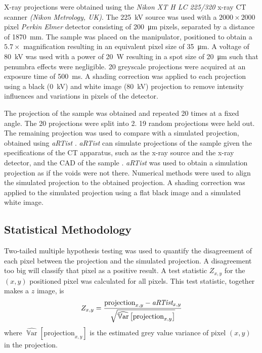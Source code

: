 \documentclass{proc}
\DeclareMathOperator{\variance}{\mathbb{V}ar}
\begin{document}
X-ray projections were obtained using the \emph{Nikon XT H LC 225/320} x-ray CT scanner \emph{(Nikon Metrology, UK)}. The \SI{225}{\kilo\volt} source was used with a $2000\times2000$ pixel \emph{Perkin Elmer} detector consisting of \SI{200}{\micro\metre} pixels, separated by a distance of \SI{1870}{\milli\metre}. The sample was placed on the manipulator, positioned to obtain a $5.7\times$ magnification resulting in an equivalent pixel size of \SI{35}{\micro\metre}. A voltage of \SI{80}{\kilo\volt} was used with a power of \SI{20}{\watt} resulting in a spot size of \SI{20}{\micro\metre} such that penumbra effects were negligible. 20 greyscale projections were acquired at an exposure time of \SI{500}{\milli\second}. A shading correction \citep{young2000shading, munzenmayer2003enhancing} was applied to each projection using a black (\SI{0}{\kilo\volt}) and white image (\SI{80}{\kilo\volt}) projection to remove intensity influences and variations in pixels of the detector.

The projection of the sample was obtained and repeated 20 times at a fixed angle. The 20 projections were split into 2. 19 random projections were held out. The remaining projection was used to compare with a simulated projection, obtained using \emph{aRTist} \citep{bellon2007artist, jaenisch2008artist, bellon2012radiographic}. \emph{aRTist} can simulate projections of the sample given the specifications of the CT apparatus, such as the x-ray source and the x-ray detector, and the
CAD of the sample \citep{bellon2011simulation, deresch2012simulating}. \emph{aRTist} was used to obtain a simulation projection as if the voids were not there. Numerical methods were used to align the simulated projection to the obtained projection. A shading correction was applied to the simulated projection using a flat black image and a simulated white image.

\subsection{Statistical Methodology}

Two-tailed multiple hypothesis testing \citep{pearson1900on, neyman1933on, fisher1970statistical} was used to quantify the disagreement of each pixel between the projection and the simulated projection. A disagreement too big will classify that pixel as a positive result. A test statistic $Z_{x,y}$ for the $(x,y)$ positioned pixel was calculated for all pixels. This test statistic, together makes a $z$ image, is
\begin{equation}
  Z_{x,y} = 
  \dfrac{
    \text{projection}_{x,y} - \emph{aRTist}_{x,y}
  }
  {
    \sqrt{\widehat{\variance}\left[\text{projection}_{x,y}\right]}
  }
\end{equation}
where $\widehat{\variance}\left[\text{projection}_{x,y}\right]$ is the estimated grey value variance of pixel $(x,y)$ in the projection.
\end{document}
